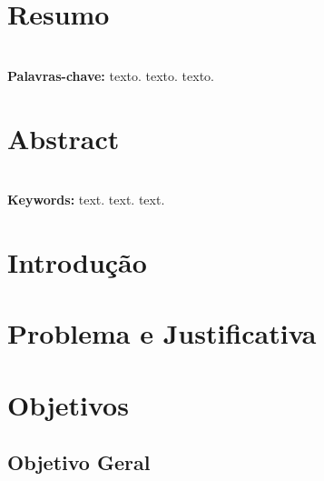 \documentclass[a4paper, 11pt]{article}
\begin{document}




\clearpage
{}

\newpage
\section*{Resumo}

\lipsum[1] \\

\textbf{Palavras-chave:} texto. texto. texto.



\vspace{3cm}
\section*{Abstract}

\lipsum[1] \\

\textbf{Keywords:} text. text. text.




\newpage
\section{Introdução}

\lipsum[1-2]



\newpage
\section{Problema e Justificativa}

\lipsum[1-2]



\newpage
\section{Objetivos}

\vspace{1cm}
\subsection{Objetivo Geral}

\lipsum[1-2]
\end{document}
